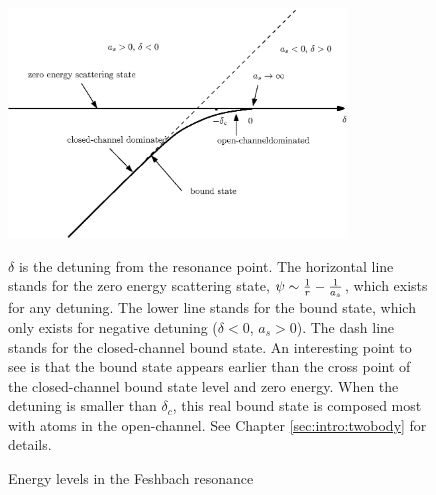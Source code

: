 \begin{figure}[htbp]
\begin{center}
\includegraphics[width=0.8\textwidth]{levels}
\caption{Energy levels in the Feshbach resonance\label{fig:intro:levels}} 
\parbox{0.7\textwidth}{\small $\delta$ is the detuning from the resonance point.  The horizontal line stands for the zero energy scattering state, $\psi\sim\frac{1}{r}-\frac{1}{a_s}$, which exists for any detuning.  The lower line stands for the bound state, which only exists for negative detuning ($\delta<0$, $a_s>0$). The dash line stands for the closed-channel bound state.  An interesting point to see is that the bound state appears earlier than the cross point of the closed-channel bound state level and zero energy. When the detuning is smaller than $\delta_c$, this real bound state is composed most with atoms in the open-channel. See Chapter \ref{sec:intro:twobody} for details.   }

\end{center}
\end{figure}

